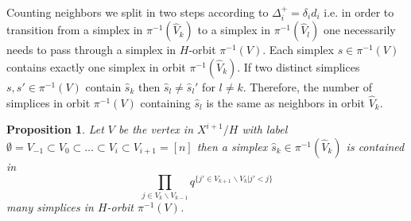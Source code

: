 \documentclass[11pt]{amsart}
\newtheorem{proposition}[theorem]{Proposition}
\begin{document}
    Counting neighbors we split in two steps according to $\Delta_i^+=\delta_id_i$ i.e. in order to transition from a simplex in $\pi^{-1}(\hat{V}_k)$ to a simplex in $\pi^{-1}(\hat{V}_l)$ one necessarily needs to pass through a simplex in $H$-orbit $\pi^{-1}(V)$. Each simplex $s\in \pi^{-1}(V)$ contains exactly one simplex in orbit $\pi^{-1}(\hat{V}_k)$. If two distinct simplices $s,s'\in \pi^{-1}(V)$ contain $\hat{s}_k$ then $\hat{s}_l\neq\hat{s}_l'$ for $l\neq k$. Therefore, the number of simplices in orbit $\pi^{-1}(V)$ containing $\hat{s}_l$ is the same as neighbors in orbit $\hat{V}_k$.
    \begin{proposition}
        Let $V$ be the vertex in $X^{i+1}/H$ with label $\emptyset=V_{-1}\subset V_0\subset\dots\subset V_i\subset V_{i+1}=[n]$ then a simplex $\hat{s}_k\in\pi^{-1}(\hat{V}_k)$ is contained in  
        \begin{equation}
            \prod_{j\in V_k\backslash V_{k-1}}q^{\{j'\in V_{k+1}\backslash V_k|j'<j\}}
            \label{eq:NoNeighbors}
        \end{equation}
        many simplices in $H$-orbit $\pi^{-1}(V)$. 
    \end{proposition}
\end{document}
